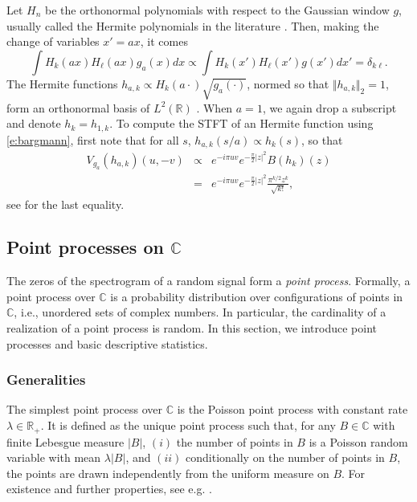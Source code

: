 Let $H_n$ be the orthonormal polynomials with respect to the Gaussian window $g$, usually called the Hermite
polynomials in the literature \citep{Gau04}. Then, making the change of variables $x'=ax$, it comes
$$
\int H_k(ax)H_\ell(ax)g_a(x)d x \propto \int H_k(x') H_\ell(x')
g(x') d x' =
\delta_{k\ell}.
$$
The Hermite functions $h_{a,k} \propto H_k(a\cdot) \sqrt{g_a(\cdot)}$, normed
so that $\Vert h_{a,k}\Vert_2 =1$, form an orthonormal basis of
$L^2(\mathbb{R})$ \citep{Gau04}. When
$a=1$, we again drop a subscript and denote $h_k=h_{1,k}$. To compute the STFT of
an Hermite function using \eqref{e:bargmann}, first note that for all $s$,
$h_{a,k}(s/a) \propto h_{k}(s)$,
so that
\begin{eqnarray*}
V_{g_a}(h_{a,k})(u,-v) &\propto& e^{-i\pi uv}e^{-\frac{\pi}{2}\vert z\vert^2} B(h_k)(z)\\
&=& e^{-i\pi uv}e^{-\frac{\pi}{2}\vert z\vert^2} \frac{\pi^{k/2}z^k}{\sqrt{k!}},
\end{eqnarray*}
see \cite[Section 3.4]{Gro01} for the last equality. 

\subsection{Point processes on $\mathbb{C}$}
\label{s:spatial}
The zeros of the spectrogram of a random signal form a \emph{point process}. Formally, a point process over $\mathbb{C}$ is a probability distribution over configurations of
points in $\mathbb{C}$, i.e., unordered sets of complex numbers. In particular,
the cardinality of a realization of a point process is random. In this section,
we introduce point processes and basic descriptive statistics.

\subsubsection{Generalities}
The simplest point process over $\mathbb{C}$ is the Poisson point process with constant rate
$\lambda\in\mathbb{R_+}$. It is defined as the unique point process
such that, for any $B\in\mathbb{C}$ with finite Lebesgue measure $\vert B\vert$,
$(i)$ the number of points in
$B$ is a Poisson random variable with mean $\lambda\vert B\vert$, and $(ii)$
conditionally on the number of points in $B$, the points are drawn independently
from the uniform measure on $B$. For existence and further properties, see e.g.
\cite[Chapter 3]{MoWa03}. 


